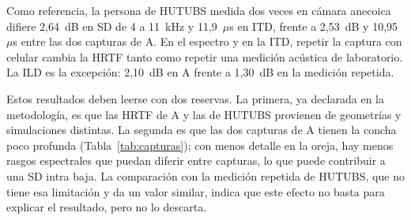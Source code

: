 Como referencia, la persona de HUTUBS medida dos veces en cámara anecoica difiere 2,64~dB en SD de 4 a 11~kHz y 11,9~$\mu$s en ITD, frente a 2,53~dB y 10,95~$\mu$s entre las dos capturas de A. En el espectro y en la ITD, repetir la captura con celular cambia la HRTF tanto como repetir una medición acústica de laboratorio. La ILD es la excepción: 2,10~dB en A frente a 1,30~dB en la medición repetida.

Estos resultados deben leerse con dos reservas. La primera, ya declarada en la metodología, es que las HRTF de A y las de HUTUBS provienen de geometrías y simulaciones distintas. La segunda es que las dos capturas de A tienen la concha poco profunda (Tabla~\ref{tab:capturas}); con menos detalle en la oreja, hay menos rasgos espectrales que puedan diferir entre capturas, lo que puede contribuir a una SD intra baja. La comparación con la medición repetida de HUTUBS, que no tiene esa limitación y da un valor similar, indica que este efecto no basta para explicar el resultado, pero no lo descarta.
